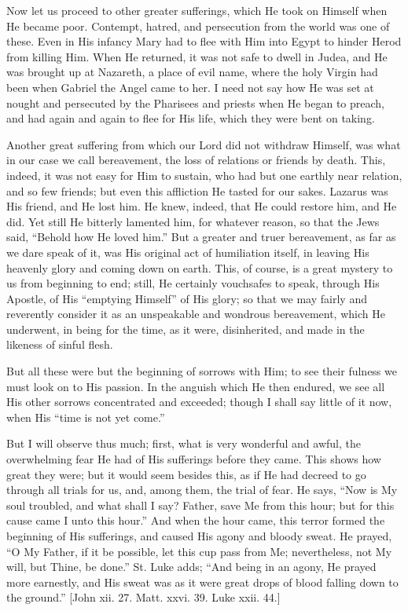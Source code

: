 Now let us proceed to other greater sufferings, which He took on
Himself when He became poor. Contempt, hatred, and persecution from the
world was one of these. Even in His infancy Mary had to flee with Him
into Egypt to hinder Herod from killing Him. When He returned, it was
not safe to dwell in Judea, and He was brought up at Nazareth, a place
of evil name, where the holy Virgin had been when Gabriel the Angel came
to her. I need not say how He was set at nought and persecuted by the
Pharisees and priests when He began to preach, and had again and again
to flee for His life, which they were bent on taking.

Another great suffering from which our Lord did not withdraw Himself,
was what in our case we call bereavement, the loss of relations or
friends by death. This, indeed, it was not easy for Him to sustain, who
had but one earthly near relation, and so few friends; but even this
affliction He tasted for our sakes. Lazarus was His friend, and He lost
him. He knew, indeed, that He could restore him, and He did. Yet still
He bitterly lamented him, for whatever reason, so that the Jews said,
``Behold how He loved him.'' But a greater and truer
bereavement, as far as we dare speak of it, was His original act of
humiliation itself, in leaving His heavenly glory and coming down on
earth. This, of course, is a great mystery to us from beginning to end;
still, He certainly vouchsafes to speak, through His Apostle, of His
``emptying Himself'' of His glory; so that we may fairly and
reverently consider it as an unspeakable and wondrous bereavement, which
He underwent, in being for the time, as it were, disinherited, and made
in the likeness of sinful flesh.

But all these were but the beginning of sorrows with Him; to see
their fulness we must look on to His passion. In the anguish which He
then endured, we see all His other sorrows concentrated and exceeded;
though I shall say little of it now, when His ``time is not yet
come.''

But I will observe thus much; first, what is very wonderful and
awful, the overwhelming fear He had of His sufferings before they came.
This shows how great they were; but it would seem besides this, as if He
had decreed to go through all trials for us, and, among them, the trial
of fear. He says, ``Now is My soul troubled, and what shall I say?
Father, save Me from this hour; but for this cause came I unto this
hour.'' And when the hour came, this terror formed the beginning of
His sufferings, and caused His agony and bloody sweat. He prayed,
``O My Father, if it be possible, let this cup pass from Me;
nevertheless, not My will, but Thine, be done.'' St. Luke adds;
``And being in an agony, He prayed more earnestly, and His sweat was
as it were great drops of blood falling down to the ground.'' [John
xii. 27. Matt. xxvi. 39. Luke xxii. 44.]

